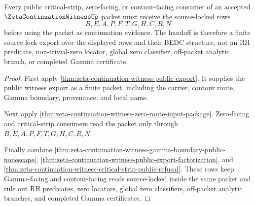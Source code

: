 \begin{theorem}
\label{thm:zeta-continuation-witness-public-source-lock-handoff}
Every public critical-strip, zero-facing, or contour-facing consumer of an accepted $\ZetaContinuationWitnessUp$ packet must receive the source-locked rows
$$
B,E,A,P,F,T,G,H,C,R,N
$$
before using the packet as continuation evidence. The handoff is therefore a finite source-lock export over the displayed rows and their BEDC structure, not an RH predicate, non-trivial-zero locator, global zero classifier, off-packet analytic branch, or completed Gamma certificate.
\end{theorem}
\begin{proof}
First apply \autoref{thm:zeta-continuation-witness-public-export}. It supplies the public witness export as a finite packet, including the carrier, contour route, Gamma boundary, provenance, and local name.

Next apply \autoref{thm:zeta-continuation-witness-zero-route-input-package}. Zero-facing and critical-strip consumers read the packet only through $B,E,A,P,F,T,G,H,C,R,N$.

Finally combine \autoref{thm:zeta-continuation-witness-gamma-boundary-public-nonescape}, \autoref{thm:zeta-continuation-witness-public-export-factorization}, and \autoref{thm:zeta-continuation-witness-critical-strip-public-refusal}. These rows keep Gamma-facing and contour-facing reads source-locked inside the same packet and rule out RH predicates, zero locators, global zero classifiers, off-packet analytic branches, and completed Gamma certificates.
\end{proof}

